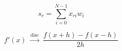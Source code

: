 \[
s_r = \sum_{i=0}^{N-1} x_{r i} w_i
\]

\[
f'(x) \;\mathrel{\overset{\mathrm{disc}}{\longrightarrow}}\;
\frac{f(x+h)-f(x-h)}{2h}
\]
